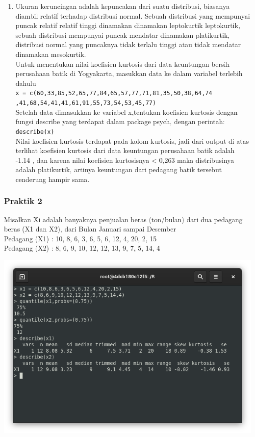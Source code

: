 \documentclass[a4paper,12pt]{article}
\begin{document}
\begin{enumerate}[label=\alph*.]
	\item Ukuran keruncingan adalah kepuncakan dari suatu distribusi, biasanya diambil relatif terhadap distribusi normal. Sebuah distribusi yang mempunyai puncak relatif relatif tinggi dinamakan dinamakan leptokurtik leptokurtik, sebuah distribusi mempunyai puncak mendatar dinamakan platikurtik, distribusi normal yang puncaknya tidak terlalu tinggi atau tidak mendatar dinamakan mesokurtik.\\
	Untuk menentukan nilai koefisien kurtosis dari data keuntungan bersih perusahaan batik di Yogyakarta, masukkan data ke dalam variabel terlebih dahulu\\
	\texttt{x = c(60,33,85,52,65,77,84,65,57,77,71,81,35,50,38,64,74\\,41,68,54,41,41,61,91,55,73,54,53,45,77)\\}
	Setelah data dimasukkan ke variabel x,tentukan koefisien kurtosis dengan fungsi describe yang terdapat dalam package psych, dengan perintah:\\
	\texttt{describe(x)}\\
	Nilai koefisien kurtosis terdapat pada kolom kurtosis, jadi dari output di atas terlihat koefisien kurtosis dari data keuntungan perusahaan batik adalah -1.14 , dan karena nilai koefisien kurtosisnya < 0,263 maka distribusinya adalah platikurtik, artinya keuntungan dari pedagang batik tersebut cenderung hampir sama.
	
\end{enumerate}

\newpage

\subsubsection{Praktik 2}
Misalkan Xi adalah banyaknya penjualan beras (ton/bulan) dari dua pedagang beras (X1 dan X2), dari  Bulan Januari sampai  Desember\\ 
Pedagang (X1) : 10, 8, 6, 3, 6, 5, 6, 12, 4, 20, 2, 15\\
Pedagang (X2) : 8, 6, 9, 10, 12, 12, 13, 9, 7, 5, 14, 4

\begin{center}
	\includegraphics[scale=.5]{2}
\end{center}
\end{document}
